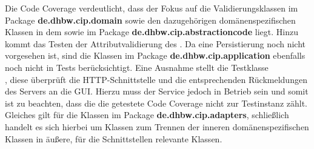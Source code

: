 Die Code Coverage verdeutlicht, dass der Fokus auf die Validierungsklassen im Package \textbf{de.dhbw.cip.domain} sowie den dazugehörigen domänenspezifischen Klassen in dem sowie im Package \textbf{de.dhbw.cip.abstractioncode} liegt. 
Hinzu kommt das Testen der Attributvalidierung des \href{https://github.com/lucasmerkel/dhbw-advancedswe-programmentwurf/blob/5764d7da4cfd0562ed8e96128e92f85c30b7309d/swe_programmentwurf/consumergoods-inventory-planner/3-cip-domain/src/main/java/de/dhbw/cip/domain/ConsumerGoods.java#L71}{}.
Da eine Persistierung noch nicht vorgesehen ist, sind die Klassen im Package \textbf{de.dhbw.cip.application} ebenfalls noch nicht in Tests berücksichtigt.
Eine Ausnahme stellt die Testklasse \\\href{https://github.com/lucasmerkel/dhbw-advancedswe-programmentwurf/blob/5764d7da4cfd0562ed8e96128e92f85c30b7309d/swe_programmentwurf/consumergoods-inventory-planner/0-cip-plugins/src/test/java/de/dhbw/cip/ConsumerGoodsGuiControllerTest.java}{}, diese überprüft die \ac{HTTP}-Schnittstelle und die entsprechenden Rückmeldungen des Servers an die GUI. 
Hierzu muss der Service jedoch in Betrieb sein und somit ist zu beachten, dass die die getestete Code Coverage nicht zur Testinstanz zählt.
Gleiches gilt für die Klassen im Package \textbf{de.dhbw.cip.adapters}, schließlich handelt es sich hierbei um Klassen zum Trennen der inneren domänenspezifischen Klassen in äußere, für die Schnittstellen relevante Klassen.

